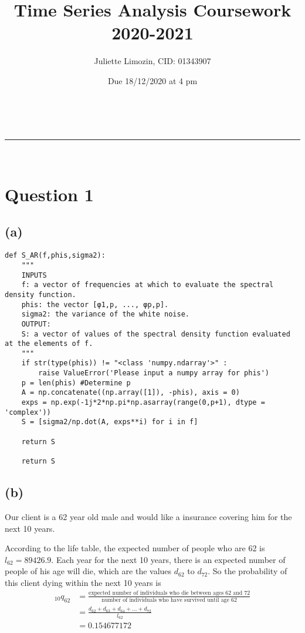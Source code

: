 \documentclass[a4paper,11pt]{article}
\makeatletter
\newcommand{\linia}{\rule{\linewidth}{0.5pt}}
\theoremstyle{mytheor}
\renewcommand{\maketitle}{
\begin{center}
\vspace{2ex}
{\huge \textsc{\@title}}
\vspace{1ex}
\\
\linia\\
\@author \hfill \@date
\vspace{1ex}
\end{center}
}
\makeatother
\begin{document}
\title{Time Series Analysis Coursework 2020-2021}

\author{Juliette Limozin, CID: 01343907}

\date{Due 18/12/2020 at 4 pm}

\maketitle

\section*{Question 1}
\subsection*{(a)}

\begin{lstlisting}
def S_AR(f,phis,sigma2):
    """
    INPUTS
    f: a vector of frequencies at which to evaluate the spectral density function.
    phis: the vector [φ1,p, ..., φp,p].
    sigma2: the variance of the white noise.
    OUTPUT:
    S: a vector of values of the spectral density function evaluated at the elements of f.
    """
    if str(type(phis)) != "<class 'numpy.ndarray'>" :
        raise ValueError('Please input a numpy array for phis')
    p = len(phis) #Determine p
    A = np.concatenate((np.array([1]), -phis), axis = 0)
    exps = np.exp(-1j*2*np.pi*np.asarray(range(0,p+1), dtype = 'complex'))
    S = [sigma2/np.dot(A, exps**i) for i in f]
    
    return S
    
    return S
\end{lstlisting}

\subsection*{(b)}

Our client is a 62 year old male and would like a insurance covering him for the next 10 years.

According to the life table, the expected number of people who are 62 is $l_{62} = 89426.9$. Each year for the next 10 years, there is an expected number of people of his age will die, which are the values $d_{62}$ to $d_{72}$. So the probability of this client dying within the next 10 years is
\begin{align*}
  _{10}q_{62} & = \frac{\text{expected number of individuals who die between ages 62 and 72}}{\text{number of individuals who have survived until age 62}} \\
  & = \frac{d_{62} + d_{63} + d_{64} + ... + d_{72}}{l_{62}} \\
  & = 0.154677172
\end{align*}
\end{document}
